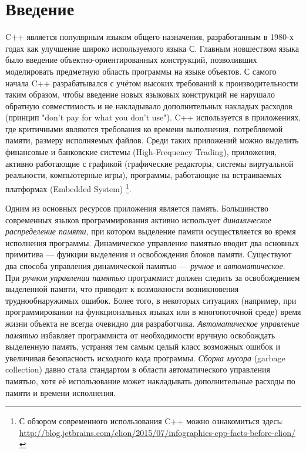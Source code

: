 \section*{Введение}

C++ является популярным языком общего назначения, разработанным в 1980-х 
годах как улучшение широко используемого языка С. 
Главным новшеством языка было введение объектно-ориентированных конструкций, 
позволивших моделировать предметную область программы на языке объектов. 
С самого начала C++ разрабатывался с учётом высоких требований к производительности 
таким образом, чтобы введение новых языковых конструкций не нарушало обратную совместимость 
и не накладывало дополнительных накладых расходов (принцип "don't pay for what you don't use"). 
C++ используется в приложениях, где критичными являются требования ко времени выполнения, 
потребляемой памяти, размеру исполняемых файлов. 
Среди таких приложений можно выделить финансовые и банковские системы (High-Frequency Trading), 
приложения, активно работающие с графикой (графические редакторы, системы виртуальной реальности, 
компьютерные игры), программы, работающие на встраиваемых платформах (Embedded System)
\footnote{С обзором современного использования C++ можно ознакомиться здесь: 
\url{http://blog.jetbrains.com/clion/2015/07/infographics-cpp-facts-before-clion/}}.

Одним из основных ресурсов приложения является память. 
Большинство современных языков программирования активно использует \emph{динамическое 
распределение памяти}, при котором выделение памяти осуществляется во время исполнения программы. 
Динамическое управление памятью вводит два основных примитива --- функции выделения и 
освобождения блоков памяти. 
Существуют два способа управления динамической памятью --- \emph{ручное} и \emph{автоматическое}. 
При \emph{ручном управлении памятью} программист должен следить за освобождением выделенной 
памяти, что приводит к возможности возникновения труднообнаружимых ошибок. 
Более того, в некоторых ситуациях (например, при программировании на функциональных языках или 
в многопоточной среде) время жизни объекта не всегда очевидно для разработчика. 
\emph{Автоматическое управление памятью} избавляет программиста от необходимости вручную 
освобождать выделенную память, устраняя тем самым целый класс возможных ошибок и увеличивая 
безопасность исходного кода программы. 
\emph{Сборка мусора} (garbage collection) давно стала стандартом в области автоматического 
управления памятью, хотя её использование может накладывать дополнительные расходы по памяти 
и времени исполнения.

